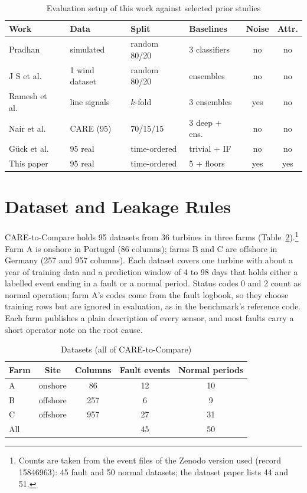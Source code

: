 \documentclass[conference]{IEEEtran}
\begin{document}
\begin{table}[t]
\caption{Evaluation setup of this work against selected prior studies}
\label{tab:scope}
\centering
\setlength{\tabcolsep}{1.6pt}
\begin{tabular}{llllcc}
\toprule
Work & Data & Split & Baselines & Noise & Attr.\\
\midrule
Pradhan \cite{r31} & simulated & random 80/20 & 3 classifiers & no & no\\
J S et al.\ \cite{r30} & 1 wind dataset & random 80/20 & ensembles & no & no\\
Ramesh et al.\ \cite{r33} & line signals & $k$-fold & 3 ensembles & yes & no\\
Nair et al.\ \cite{r29} & CARE (95) & 70/15/15 & 3 deep + ens. & no & no\\
G\"uck et al.\ \cite{r12} & 95 real & time-ordered & trivial + IF & no & no\\
This paper & 95 real & time-ordered & 5 + floors & yes & yes\\
\bottomrule
\end{tabular}
\end{table}

\section{Dataset and Leakage Rules}
CARE-to-Compare \cite{r12} holds 95 datasets from 36 turbines in three farms (Table~\ref{tab:data}).\footnote{Counts are taken from the event files of the Zenodo version used (record 15846963): 45 fault and 50 normal datasets; the dataset paper \cite{r12} lists 44 and 51.} Farm A is onshore in Portugal (86 columns); farms B and C are offshore in Germany (257 and 957 columns). Each dataset covers one turbine with about a year of training data and a prediction window of 4 to 98 days that holds either a labelled event ending in a fault or a normal period. Status codes 0 and 2 count as normal operation; farm A's codes come from the fault logbook, so they choose training rows but are ignored in evaluation, as in the benchmark's reference code. Each farm publishes a plain description of every sensor, and most faults carry a short operator note on the root cause.

\begin{table}[t]
\caption{Datasets (all of CARE-to-Compare)}
\label{tab:data}
\centering
\begin{tabular}{lcccc}
\toprule
Farm & Site & Columns & Fault events & Normal periods\\
\midrule
A & onshore & 86 & 12 & 10\\
B & offshore & 257 & 6 & 9\\
C & offshore & 957 & 27 & 31\\
\midrule
All & & & 45 & 50\\
\bottomrule
\end{tabular}
\end{table}
\end{document}
